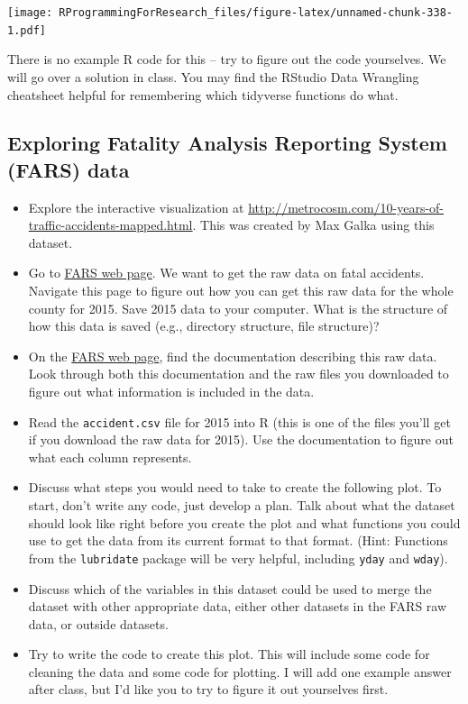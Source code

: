 \documentclass[]{book}
\providecommand{\tightlist}{%
  \setlength{\itemsep}{0pt}\setlength{\parskip}{0pt}}
\begin{document}
\texttt{[image: RProgrammingForResearch\_files/figure-latex/unnamed-chunk-338-1.pdf]}

There is no example R code for this -- try to figure out the code
yourselves. We will go over a solution in class. You may find the
RStudio Data Wrangling cheatsheet helpful for remembering which
tidyverse functions do what.

\subsection{Exploring Fatality Analysis Reporting System (FARS)
data}\label{exploring-fatality-analysis-reporting-system-fars-data}

\begin{itemize}
\tightlist
\item
  Explore the interactive visualization at
  \url{http://metrocosm.com/10-years-of-traffic-accidents-mapped.html}.
  This was created by Max Galka using this dataset.
\item
  Go to \href{http://www.nhtsa.gov/FARS}{FARS web page}. We want to get
  the raw data on fatal accidents. Navigate this page to figure out how
  you can get this raw data for the whole county for 2015. Save 2015
  data to your computer. What is the structure of how this data is saved
  (e.g., directory structure, file structure)?
\item
  On the \href{http://www.nhtsa.gov/FARS}{FARS web page}, find the
  documentation describing this raw data. Look through both this
  documentation and the raw files you downloaded to figure out what
  information is included in the data.
\item
  Read the \texttt{accident.csv} file for 2015 into R (this is one of
  the files you'll get if you download the raw data for 2015). Use the
  documentation to figure out what each column represents.
\item
  Discuss what steps you would need to take to create the following
  plot. To start, don't write any code, just develop a plan. Talk about
  what the dataset should look like right before you create the plot and
  what functions you could use to get the data from its current format
  to that format. (Hint: Functions from the \texttt{lubridate} package
  will be very helpful, including \texttt{yday} and \texttt{wday}).
\item
  Discuss which of the variables in this dataset could be used to merge
  the dataset with other appropriate data, either other datasets in the
  FARS raw data, or outside datasets.
\item
  Try to write the code to create this plot. This will include some code
  for cleaning the data and some code for plotting. I will add one
  example answer after class, but I'd like you to try to figure it out
  yourselves first.
\end{itemize}
\end{document}
